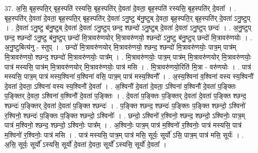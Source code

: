 \documentclass[17pt]{extarticle}
\begin{document}
37. अ॒सि॒ बृह॒स्पति॒र् बृह॒स्पति॑ रस्यसि॒ बृह॒स्पति॑र् दे॒वता॑ दे॒वता॒ बृह॒स्पति॑ रस्यसि॒ बृह॒स्पति॑र् दे॒वता᳚ । . बृह॒स्पति॑र् दे॒वता॑ दे॒वता॒ बृह॒स्पति॒र् बृह॒स्पति॑र् दे॒वता॑ ऽनु॒ष्टु ब॑नु॒ष्टुब् दे॒वता॒ बृह॒स्पति॒र् बृह॒स्पति॑र् दे॒वता॑ ऽनु॒ष्टुप् । . दे॒वता॑ ऽनु॒ष्टु ब॑नु॒ष्टुब् दे॒वता॑ दे॒वता॑ ऽनु॒ष्टुप् छन्द॒ श्छन्दो॑ ऽनु॒ष्टुब् दे॒वता॑ दे॒वता॑ ऽनु॒ष्टुप् छन्दः॑ । . अ॒नु॒ष्टुप् छन्द॒ श्छन्दो॑ ऽनु॒ष्टु ब॑नु॒ष्टुप् छन्दो॑ मि॒त्रावरु॑णयोर् मि॒त्रावरु॑णयो॒ श्छन्दो॑ ऽनु॒ष्टु ब॑नु॒ष्टुप् छन्दो॑ मि॒त्रावरु॑णयोः । . अ॒नु॒ष्टुबित्य॑नु - स्तुप् । . छन्दो॑ मि॒त्रावरु॑णयोर् मि॒त्रावरु॑णयो॒ श्छन्द॒ श्छन्दो॑ मि॒त्रावरु॑णयोः॒ पात्र॒म् पात्र॑म् मि॒त्रावरु॑णयो॒ श्छन्द॒ श्छन्दो॑ मि॒त्रावरु॑णयोः॒ पात्र᳚म् । . मि॒त्रावरु॑णयोः॒ पात्र॒म् पात्र॑म् मि॒त्रावरु॑णयोर् मि॒त्रावरु॑णयोः॒ पात्र॑ मस्यसि॒ पात्र॑म् मि॒त्रावरु॑णयोर् मि॒त्रावरु॑णयोः॒ पात्र॑ मसि । . मि॒त्रावरु॑णयो॒रिति॑ मि॒त्रा - वरु॑णयोः । . पात्र॑ मस्यसि॒ पात्र॒म् पात्र॑ मस्य॒श्विना॑ व॒श्विना॑ वसि॒ पात्र॒म् पात्र॑ मस्य॒श्विनौ᳚ । . अ॒स्य॒श्विना॑ व॒श्विना॑ वस्य स्य॒श्विनौ॑ दे॒वता॑ दे॒वता॒ ऽश्विना॑ वस्य स्य॒श्विनौ॑ दे॒वता᳚ । . अ॒श्विनौ॑ दे॒वता॑ दे॒वता॒ ऽश्विना॑ व॒श्विनौ॑ दे॒वता॑ प॒ङ्क्तिः प॒ङ्क्तिर् दे॒वता॒ ऽश्विना॑ व॒श्विनौ॑ दे॒वता॑ प॒ङ्क्तिः । . दे॒वता॑ प॒ङ्क्तिः प॒ङ्क्तिर् दे॒वता॑ दे॒वता॑ प॒ङ्क्ति श्छन्द॒ श्छन्दः॑ प॒ङ्क्तिर् दे॒वता॑ दे॒वता॑ प॒ङ्क्ति श्छन्दः॑ । . प॒ङ्क्ति श्छन्द॒ श्छन्दः॑ प॒ङ्क्तिः प॒ङ्क्ति श्छन्दो॒ ऽश्विनो॑ र॒श्विनो॒ श्छन्दः॑ प॒ङ्क्तिः प॒ङ्क्ति श्छन्दो॒ ऽश्विनोः᳚ । . छन्दो॒ ऽश्विनो॑ र॒श्विनो॒ श्छन्द॒ श्छन्दो॒ ऽश्विनोः॒ पात्र॒म् पात्र॑ म॒श्विनो॒ श्छन्द॒ श्छन्दो॒ ऽश्विनोः॒ पात्र᳚म् । . अ॒श्विनोः॒ पात्र॒म् पात्र॑ म॒श्विनो॑ र॒श्विनोः॒ पात्र॑ मस्यसि॒ पात्र॑ म॒श्विनो॑ र॒श्विनोः॒ पात्र॑ मसि । . पात्र॑ मस्यसि॒ पात्र॒म् पात्र॑ मसि॒ सूर्यः॒ सूर्यो॑ ऽसि॒ पात्र॒म् पात्र॑ मसि॒ सूर्यः॑ । . अ॒सि॒ सूर्यः॒ सूर्यो᳚ ऽस्यसि॒ सूर्यो॑ दे॒वता॑ दे॒वता॒ सूर्यो᳚ ऽस्यसि॒ सूर्यो॑ दे॒वता᳚ । \newline
\end{document}
